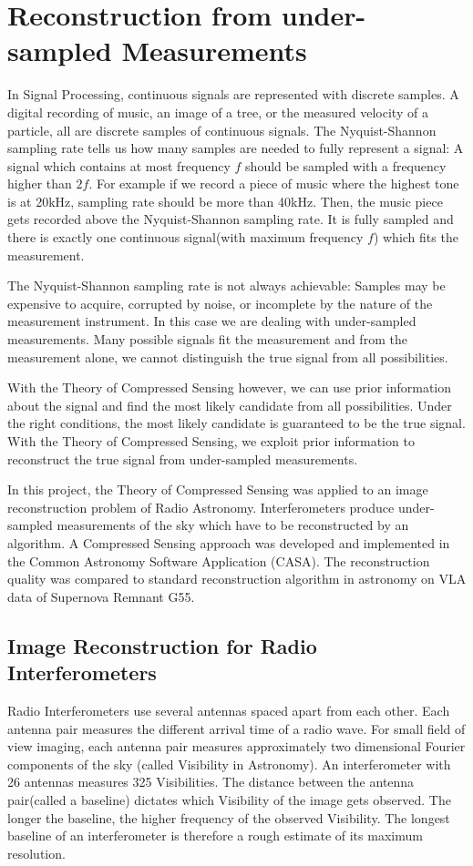 \section{Reconstruction from under-sampled Measurements}\label{intro}
In Signal Processing, continuous signals are represented with discrete samples. A digital recording of music, an image of a tree, or the measured velocity of a particle, all are discrete samples of continuous signals. The Nyquist-Shannon sampling rate tells us how many samples are needed to fully represent a signal: A signal which contains at most frequency $f$ should be sampled with a frequency higher than $2f$. For example if we record a piece of music where the highest tone is at 20kHz, sampling rate should be more than 40kHz. Then, the music piece gets recorded above the Nyquist-Shannon sampling rate. It is fully sampled and there is exactly one continuous signal(with maximum frequency $f$) which fits the measurement.

The Nyquist-Shannon sampling rate is not always achievable: Samples may be expensive to acquire, corrupted by noise, or incomplete by the nature of the measurement instrument. In this case we are dealing with under-sampled measurements. Many possible signals fit the measurement and from the measurement alone, we cannot distinguish the true signal from all possibilities.

With the Theory of Compressed Sensing\cite{candes2006robust}\cite{donoho2006compressed} however, we can use prior information about the signal and find the most likely candidate from all possibilities. Under the right conditions, the most likely candidate is guaranteed to be the true signal. With the Theory of Compressed Sensing, we exploit prior information to reconstruct the true signal from under-sampled measurements.

In this project, the Theory of Compressed Sensing was applied to an image reconstruction problem of Radio Astronomy. Interferometers produce under-sampled measurements of the sky which have to be reconstructed by an algorithm. A Compressed Sensing approach was developed and implemented in the Common Astronomy Software Application (CASA). The reconstruction quality was compared to standard reconstruction algorithm in astronomy on VLA data of Supernova Remnant G55.


\subsection{Image Reconstruction for Radio Interferometers}
Radio Interferometers use several antennas spaced apart from each other. Each antenna pair measures the different arrival time of a radio wave. For small field of view imaging, each antenna pair measures approximately two dimensional Fourier components of the sky (called Visibility in Astronomy). An interferometer with 26 antennas measures 325 Visibilities. The distance between the antenna pair(called a baseline) dictates which Visibility of the image gets observed. The longer the baseline, the higher frequency of the observed Visibility. The longest baseline of an interferometer is therefore a rough estimate of its maximum resolution.

